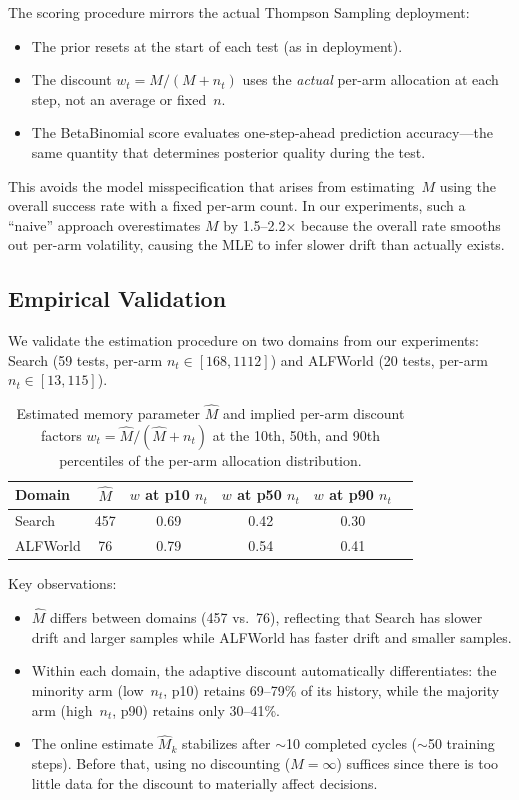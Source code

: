 \documentclass{article}
\theoremstyle{plain}
\theoremstyle{definition}
\theoremstyle{remark}
\begin{document}
The scoring procedure mirrors the actual Thompson Sampling deployment:
\begin{itemize}[itemsep=2pt, leftmargin=*]
    \item The prior resets at the start of each test (as in deployment).
    \item The discount $w_t = M/(M + n_t)$ uses the \emph{actual} per-arm allocation at each step, not an average or fixed~$n$.
    \item The BetaBinomial score evaluates one-step-ahead prediction accuracy---the same quantity that determines posterior quality during the test.
\end{itemize}
This avoids the model misspecification that arises from estimating~$M$ using the overall success rate with a fixed per-arm count. In our experiments, such a ``naive'' approach overestimates $M$ by 1.5--2.2$\times$ because the overall rate smooths out per-arm volatility, causing the MLE to infer slower drift than actually exists.

\subsection{Empirical Validation}

We validate the estimation procedure on two domains from our experiments: Search (59 tests, per-arm $n_t \in [168, 1112]$) and ALFWorld (20 tests, per-arm $n_t \in [13, 115]$).

\begin{table}[h]
\centering
\caption{Estimated memory parameter $\hat{M}$ and implied per-arm discount factors $w_t = \hat{M}/(\hat{M} + n_t)$ at the 10th, 50th, and 90th percentiles of the per-arm allocation distribution.}
\label{tab:m_estimates}
\begin{tabular}{@{}lccccc@{}}
\toprule
\textbf{Domain} & $\hat{M}$ & $w$ \textbf{at p10} $n_t$ & $w$ \textbf{at p50} $n_t$ & $w$ \textbf{at p90} $n_t$ \\
\midrule
Search    & 457 & 0.69 & 0.42 & 0.30 \\
ALFWorld  &  76 & 0.79 & 0.54 & 0.41 \\
\bottomrule
\end{tabular}
\end{table}

\noindent Key observations:
\begin{itemize}[itemsep=2pt, leftmargin=*]
    \item $\hat{M}$ differs between domains (457 vs.\ 76), reflecting that Search has slower drift and larger samples while ALFWorld has faster drift and smaller samples.
    \item Within each domain, the adaptive discount automatically differentiates: the minority arm (low~$n_t$, p10) retains 69--79\% of its history, while the majority arm (high~$n_t$, p90) retains only 30--41\%.
    \item The online estimate $\hat{M}_k$ stabilizes after ${\sim}$10 completed cycles (${\sim}$50 training steps). Before that, using no discounting ($M = \infty$) suffices since there is too little data for the discount to materially affect decisions.
\end{itemize}
\end{document}
